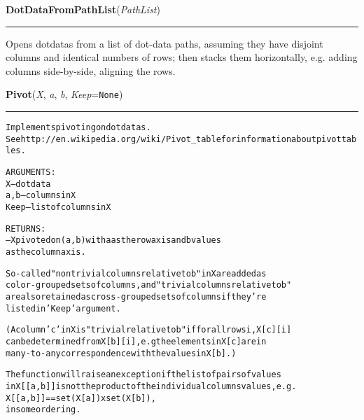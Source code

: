    \label{Classes:DotData:DotDataFromPathList}

    \vspace{0.5ex}

\hspace{.8\funcindent}\begin{boxedminipage}{\funcwidth}

    \raggedright \textbf{DotDataFromPathList}(\textit{PathList})

    \vspace{-1.5ex}

    \rule{\textwidth}{0.5\fboxrule}
\setlength{\parskip}{2ex}
    Opens dotdatas from a list of dot-data paths, assuming they have 
    disjoint columns and identical numbers of rows; then stacks them 
    horizontally, e.g. adding columns side-by-side, aligning the rows.

\setlength{\parskip}{1ex}
    \end{boxedminipage}

    \label{Classes:DotData:Pivot}

    \vspace{0.5ex}

\hspace{.8\funcindent}\begin{boxedminipage}{\funcwidth}

    \raggedright \textbf{Pivot}(\textit{X}, \textit{a}, \textit{b}, \textit{Keep}={\tt None})

    \vspace{-1.5ex}

    \rule{\textwidth}{0.5\fboxrule}
\setlength{\parskip}{2ex}
\begin{alltt}

Implements pivoting on dotdatas.  
See http://en.wikipedia.org/wiki/Pivot\_table for information about pivot tables.

ARGUMENTS:
X -- dotdata 
a,b -- columns in X
Keep -- list of columns in X

RETURNS:
--X pivoted on (a,b) with a as the row axis and b values 
as the column axis. 

So-called "nontrivial columns relative to b" in X are added as
color-grouped sets of columns, and "trivial columns relative to b"  
are also retained as cross-grouped sets of columns if they're 
listed in 'Keep' argument.   

(A column 'c' in X is "trivial relative to b" if for all rows i, X[c][i]  
can be determined from X[b][i], e.g the elements in X[c] are in 
many-to-any correspondence with the values in X[b].)
        
The function will raise an exception if the list of pairs of values
in X[[a,b]] is not the product of the individual columns values, e.g. 
        X[[a,b]]   ==   set(X[a])   x   set(X[b])   ,
in some ordering. 
\end{alltt}

\setlength{\parskip}{1ex}
    \end{boxedminipage}

